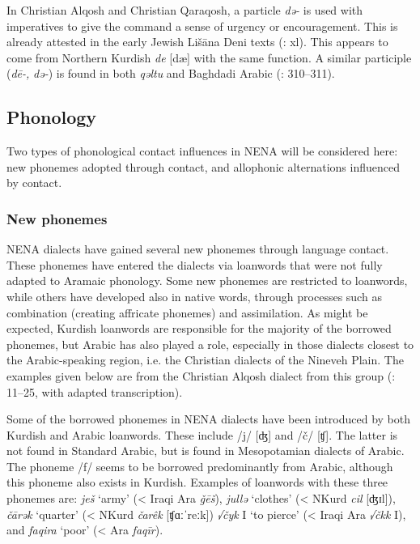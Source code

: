 \documentclass[output=paper]{langsci/langscibook}
\begin{document}
In Christian Alqosh and Christian Qaraqosh, a particle \textit{də\nobreakdash-} is used with imperatives to give the command a sense of urgency or encouragement. This is already attested in the early Jewish Lišāna Deni texts (\citealt{Sabar1976}: xl). This appears to come from Northern Kurdish \textit{de} [dæ] with the same function. A similar participle (\textit{dē\nobreakdash-,} \textit{də\nobreakdash-}) is found in both \textit{qəltu} and Baghdadi Arabic (\citealt{Jastrow1978}: 310–311).

\subsection{Phonology}

Two types of phonological contact influences in NENA will be considered here: new phonemes adopted through contact, and allophonic alternations influenced by contact.

\subsubsection{New phonemes}

NENA dialects have gained several new phonemes through language contact. These phonemes have entered the dialects via loanwords that were not fully adapted to Aramaic phonology. Some new phonemes are restricted to loanwords, while others have developed also in native words, through processes such as combination (creating affricate phonemes) and assimilation. As might be expected, Kurdish loanwords are responsible for the majority of the borrowed phonemes, but Arabic has also played a role, especially in those dialects closest to the Arabic-speaking region, i.e. the Christian dialects of the Nineveh Plain. The examples given below are from the Christian Alqosh dialect from this group (\citealt{Coghill2004}: 11–25, with adapted transcription).

Some of the borrowed phonemes in NENA dialects have been introduced by both Kurdish and Arabic loanwords. These include /j/ [ʤ] and /č/ [ʧ]. The latter is not found in Standard Arabic, but is found in Mesopotamian dialects of Arabic. The phoneme /f/ seems to be borrowed predominantly from Arabic, although this phoneme also exists in Kurdish. Examples of loanwords with these three phonemes are: \textit{ješ} ‘army’ (< Iraqi Ara \textit{ǧēš}), \textit{jullə} ‘clothes’ (< NKurd \textit{cil} [ʤɪl]), \textit{čārək} ‘quarter’ (< NKurd \textit{čarêk} [ʧɑːˈreːk]) \textit{√čyk} I ‘to pierce’ (< Iraqi Ara \textit{√čkk} I), and \textit{faqira} ‘poor’ (< Ara \textit{faqīr}).
\end{document}
